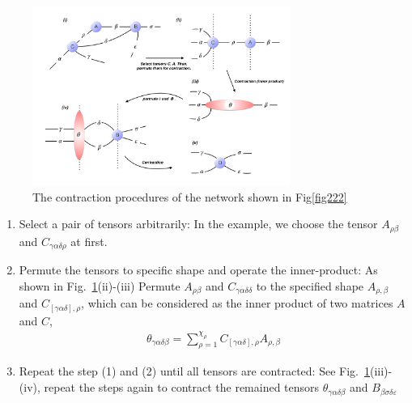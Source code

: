 \begin{figure}[ht]
	\centering
	\includegraphics[width=0.75\textwidth]{figures/fig223.png}
	\caption[The contraction procedures of the network shown in Fig\ref{fig222}(ii)]{ The contraction procedures of the network shown in Fig\ref{fig222}}
	\label{fig223}
\end{figure}

\begin{enumerate}

	\item Select a pair of tensors arbitrarily: In the example, we choose the tensor $A_{\rho \beta}$ and $C_{\gamma \alpha \delta \rho}$ at first. 
	\item Permute the tensors to specific shape and operate the inner-product: As shown in Fig.~\ref{fig223}(ii)-(iii) Permute $A_{\rho \beta}$ and $C_{\gamma \alpha \delta \delta}$ to the specified shape $A_{\rho, \beta}$ and $C_{[\gamma \alpha \delta], \rho}$, which can be considered as the inner product of two matrices $A$ and $C$, 
		\begin{align}
			\theta_{\gamma \alpha \delta \beta} = \sum_{\rho = 1}^{\chi_{\rho}}{C_{[\gamma \alpha \delta], \rho} A_{\rho, \beta}}
		\end{align}
	\item Repeat the step (1) and (2) until all tensors are contracted: See Fig.~\ref{fig223}(iii)-(iv), repeat the steps again to contract the remained tensors $\theta_{\gamma \alpha \delta \beta}$ and $B_{\beta \sigma \delta \varepsilon}$
\end{enumerate}

